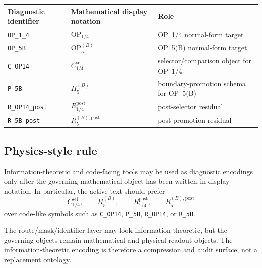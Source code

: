 \begin{center}
\small
\setlength{\tabcolsep}{3pt}
\begin{tabular}{@{}p{}P{0.28\textwidth}P{0.35\textwidth}@{}}
\toprule
Diagnostic identifier & Mathematical display notation & Role\\
\midrule
\texttt{OP\_1\_4} & \(\mathrm{OP}_{1/4}\) & OP~1/4 normal-form target\\
\texttt{OP\_5B} & \(\mathrm{OP}_{5}^{(B)}\) & OP~5(B) normal-form target\\
\texttt{C\_OP14} & \(C_{1/4}^{\mathrm{sel}}\) & selector/comparison object for OP~1/4\\
\texttt{P\_5B} & \(\Pi_{5}^{(B)}\) & boundary-promotion schema for OP~5(B)\\
\texttt{R\_OP14\_post} & \(R_{1/4}^{\mathrm{post}}\) & post-selector residual\\
\texttt{R\_5B\_post} & \(R_{5}^{(B),\mathrm{post}}\) & post-promotion residual\\
\bottomrule
\end{tabular}
\end{center}

\subsection{Physics-style rule}
\label{subsec:v410r05-physics-style-rule}

\begin{definition}
\label{def:v410r05-physics-style-rule}
Information-theoretic and code-facing tools may be used as diagnostic encodings
only after the governing mathematical object has been written in display
notation. In particular, the active text should prefer
\[
 C_{1/4}^{\mathrm{sel}},\qquad
 \Pi_{5}^{(B)},\qquad
 R_{1/4}^{\mathrm{post}},\qquad
 R_{5}^{(B),\mathrm{post}}
\]
over code-like symbols such as \texttt{C\_OP14}, \texttt{P\_5B},
\texttt{R\_OP14}, or \texttt{R\_5B}.
\end{definition}

\begin{remark}
\label{rem:v410r05-information-theory-diagnostic-layer}
The route/mask/identifier layer may look information-theoretic, but the
governing objects remain mathematical and physical readout objects. The
information-theoretic encoding is therefore a compression and audit surface, not
a replacement ontology.
\end{remark}

